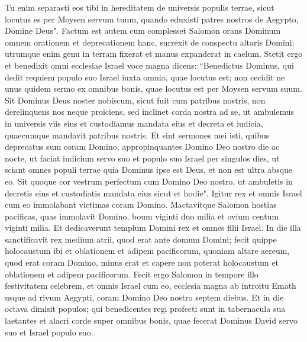 \begin{biblechapter}
\verse Tu enim separasti eos tibi in hereditatem de universis populis terrae, sicut locutus es per Moysen servum tuum, quando eduxisti patres nostros de Aegypto, Domine Deus". 
\verse Factum est autem cum complesset Salomon orans Dominum omnem orationem et deprecationem hanc, surrexit de conspectu altaris Domini; utrumque enim genu in terram fixerat et manus expanderat in caelum. 
\verse Stetit ergo et benedixit omni ecclesiae Israel voce magna dicens: 
\verse “Benedictus Dominus, qui dedit requiem populo suo Israel iuxta omnia, quae locutus est; non cecidit ne unus quidem sermo ex omnibus bonis, quae locutus est per Moysen servum suum. 
\verse Sit Dominus Deus noster nobiscum, sicut fuit cum patribus nostris, non derelinquens nos neque proiciens, 
\verse sed inclinet corda nostra ad se, ut ambulemus in universis viis eius et custodiamus mandata eius et decreta et iudicia, quaecumque mandavit patribus nostris. 
\verse Et sint sermones mei isti, quibus deprecatus sum coram Domino, appropinquantes Domino Deo nostro die ac nocte, ut faciat iudicium servo suo et populo suo Israel per singulos dies,  
\verse ut sciant omnes populi terrae quia Dominus ipse est Deus, et non est ultra absque eo. 
\verse Sit quoque cor vestrum perfectum cum Domino Deo nostro, ut ambuletis in decretis eius et custodiatis mandata eius sicut et hodie". 
\verse Igitur rex et omnis Israel cum eo immolabant victimas coram Domino. 
\verse Mactavitque Salomon hostias pacificas, quas immolavit Domino, boum viginti duo milia et ovium centum viginti milia. Et dedicaverunt templum Domini rex et omnes filii Israel. 
\verse In die illa sanctificavit rex medium atrii, quod erat ante domum Domini; fecit quippe holocaustum ibi et oblationem et adipem pacificorum, quoniam altare aereum, quod erat coram Domino, minus erat et capere non poterat holocaustum et oblationem et adipem pacificorum. 
\verse Fecit ergo Salomon in tempore illo festivitatem celebrem, et omnis Israel cum eo, ecclesia magna ab introitu Emath usque ad rivum Aegypti, coram Domino Deo nostro septem diebus.  
\verse Et in die octava dimisit populos; qui benedicentes regi profecti sunt in tabernacula sua laetantes et alacri corde super omnibus bonis, quae fecerat Dominus David servo suo et Israel populo suo. 
\end{biblechapter}

